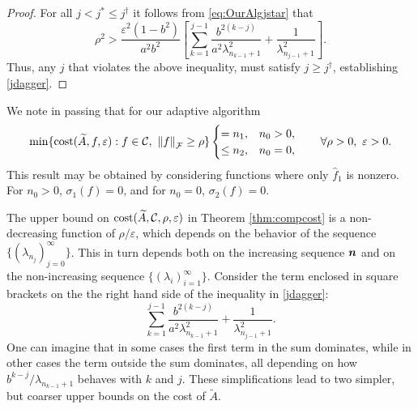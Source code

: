 \documentclass[graybox,footinfo]{svmult}
\newcommand{\DHJRnorm}[2][{}]{\ensuremath{\left \lVert #2 \right \rVert}_{#1}}
\begin{document}
\begin{proof}
For all $j < j^* \le j^\dagger$ it follows from \eqref{eq:OurAlgjstar} that
\begin{equation*}
\rho^2 > \frac{\varepsilon^2(1 - b^2)}{a^2b^2} \left[ \sum_{k=1}^{j-1} \frac{ b^{2(k-j)}}{a^{2}\lambda_{n_{k-1}+1}^2} + \frac{1}{\lambda_{n_{j-1}+1}^2}\right].
\end{equation*}
Thus, any $j$ that violates the above inequality, must satisfy $j \ge j^\dagger$, establishing \eqref{jdagger}.
\end{proof}

We note in passing that for our adaptive algorithm
\begin{equation*}
 \min \{\textup{cost}(\widetilde{A},f,\varepsilon) : f \in \calC, \ \DHJRnorm[\calF]{f} \ge \rho \} 
 \begin{cases} = n_1, & n_0 > 0, \\
 \le n_2, & n_0 = 0, 
 \end{cases}
 \qquad \forall \rho > 0, \ \varepsilon > 0.
\end{equation*}
This result may be obtained by considering functions where only $\widehat{f}_1$ is nonzero.  For $n_0 > 0$, $\sigma_1(f) = 0$, and for $n_0 = 0$, $\sigma_2(f) = 0$.

The upper bound on $\textup{cost}(\widetilde{A},{\mathcal{C}},\rho,\varepsilon)$ in Theorem \ref{thm:compcost}  is a non-decreasing function of $\rho/\varepsilon$, which depends on the behavior of the sequence $\{(\lambda_{n_j})_{j=0}^\infty\}$.  This in turn depends both on the increasing sequence ${\boldsymbol{n}}$ and on the non-increasing sequence $\{(\lambda_i)_{i=1}^\infty\}$. Consider the  term enclosed in square brackets on the the right hand side of the inequality in \eqref{jdagger}: \begin{equation} \label{keysum}
\sum_{k=1}^{j-1} \frac{b^{2(k-j)}}{a^2\lambda_{n_{k-1}+1}^2} + \frac{1}{\lambda_{n_{j-1}+1}^2}.
\end{equation}
One can imagine that in some cases the first term in the sum dominates, while in other cases the term outside the sum dominates, all depending on how $b^{k-j}/\lambda_{n_{k-1}+1}$ behaves with $k$ and $j$.  These simplifications lead to two simpler, but coarser upper bounds on the cost of $\widetilde{A}$.
\end{document}
